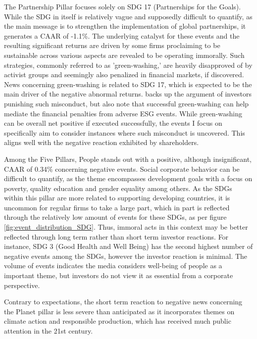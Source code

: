 The Partnership Pillar focuses solely on SDG 17 (Partnerships for the Goals). While the SDG in itself is relatively vague and supposedly difficult to quantify, as the main message is to strengthen the implementation of global partnerships, it generates a CAAR of -1.1\%. The underlying catalyst for these events and the resulting significant returns are driven by some firms proclaiming to be sustainable across various aspects are revealed to be operating immorally. Such strategies, commonly referred to as 'green-washing,' are heavily disapproved of by activist groups and seemingly also penalized in financial markets, if discovered. News concerning green-washing is related to SDG 17, which is expected to be the main driver of the negative abnormal returns. \cite{Blancard_ESG_sentiment} backs up the argument of investors punishing such misconduct, but also note that successful green-washing can help mediate the financial penalties from adverse ESG events. While green-washing can be overall net positive if executed successfully, the events I focus on specifically aim to consider instances where such misconduct is uncovered. This aligns well with the negative reaction exhibited by shareholders. 

Among the Five Pillars, People stands out with a positive, although insignificant, CAAR of 0.34\% concerning negative events. Social corporate behavior can be difficult to quantify, as the theme encompasses development goals with a focus on poverty, quality education and gender equality among others. As the SDGs within this pillar are more related to supporting developing countries, it is uncommon for regular firms to take a large part, which in part is reflected through the relatively low amount of events for these SDGs, as per figure \ref{fig:event_distribution_SDG}. Thus, immoral acts in this context may be better reflected through long term rather than short term investor reactions. For instance, SDG 3 (Good Health and Well Being) has the second highest number of negative events among the SDGs, however the investor reaction is minimal. The volume of events indicates the media considers well-being of people as a important theme, but investors do not view it as essential from a corporate perspective. 

Contrary to expectations, the short term reaction to negative news concerning the Planet pillar is less severe than anticipated as it incorporates themes on climate action and responsible production, which has received much public attention in the 21st century.

